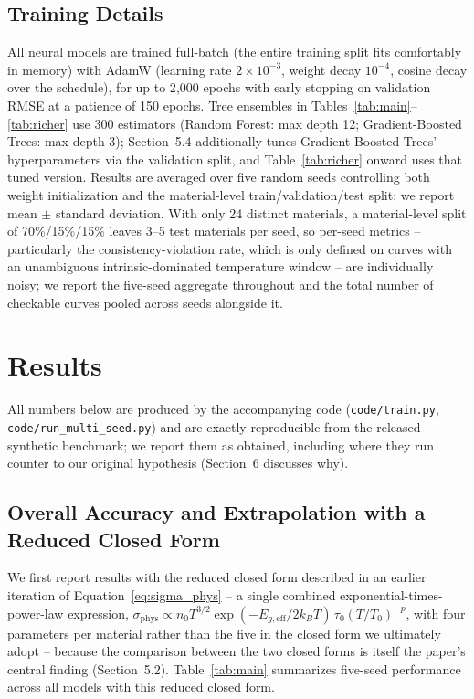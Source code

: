 \documentclass[11pt]{article}
\begin{document}
\subsection{Training Details}

All neural models are trained full-batch (the entire training split fits comfortably in memory) with AdamW (learning rate $2\times10^{-3}$, weight decay $10^{-4}$, cosine decay over the schedule), for up to 2{,}000 epochs with early stopping on validation RMSE at a patience of 150 epochs. Tree ensembles in Tables~\ref{tab:main}--\ref{tab:richer} use 300 estimators (Random Forest: max depth 12; Gradient-Boosted Trees: max depth 3); Section~5.4 additionally tunes Gradient-Boosted Trees' hyperparameters via the validation split, and Table~\ref{tab:richer} onward uses that tuned version. Results are averaged over five random seeds controlling both weight initialization and the material-level train/validation/test split; we report mean $\pm$ standard deviation. With only 24 distinct materials, a material-level split of 70\%/15\%/15\% leaves 3--5 test materials per seed, so per-seed metrics -- particularly the consistency-violation rate, which is only defined on curves with an unambiguous intrinsic-dominated temperature window -- are individually noisy; we report the five-seed aggregate throughout and the total number of checkable curves pooled across seeds alongside it.

\section{Results}

All numbers below are produced by the accompanying code (\texttt{code/train.py}, \texttt{code/run\_multi\_seed.py}) and are exactly reproducible from the released synthetic benchmark; we report them as obtained, including where they run counter to our original hypothesis (Section~6 discusses why).

\subsection{Overall Accuracy and Extrapolation with a Reduced Closed Form}

We first report results with the reduced closed form described in an earlier iteration of Equation~\ref{eq:sigma_phys} -- a single combined exponential-times-power-law expression, $\sigma_{\text{phys}} \propto n_0 T^{3/2}\exp(-E_{g,\text{eff}}/2k_BT)\,\tau_0(T/T_0)^{-p}$, with four parameters per material rather than the five in the closed form we ultimately adopt -- because the comparison between the two closed forms is itself the paper's central finding (Section~5.2). Table~\ref{tab:main} summarizes five-seed performance across all models with this reduced closed form.
\end{document}
